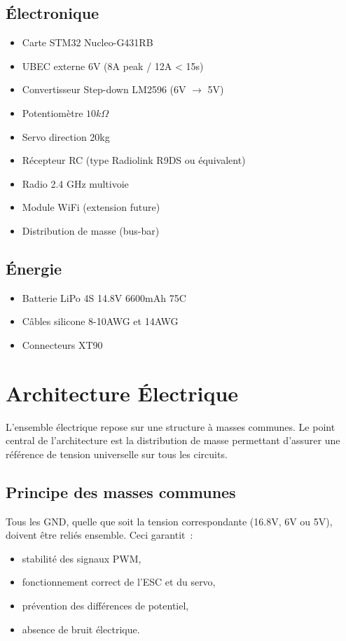 \documentclass[12pt,a4paper,french]{report}
\begin{document}
\section{Électronique}
\begin{itemize}
    \item Carte STM32 Nucleo-G431RB
    \item UBEC externe 6V (8A peak / 12A < 15s)
    \item Convertisseur Step-down LM2596 (6V $\rightarrow$ 5V)
    \item Potentiomètre $10k\Omega$
    \item Servo direction 20kg
    \item Récepteur RC (type Radiolink R9DS ou équivalent)
    \item Radio 2.4 GHz multivoie
    \item Module WiFi (extension future)
    \item Distribution de masse (bus-bar)
\end{itemize}

\section{Énergie}
\begin{itemize}
    \item Batterie LiPo 4S 14.8V 6600mAh 75C
    \item Câbles silicone 8-10AWG et 14AWG
    \item Connecteurs XT90
\end{itemize}


\chapter{Architecture Électrique}

L'ensemble électrique repose sur une structure à masses communes. Le point central de l'architecture est la distribution de masse permettant d'assurer une référence de tension universelle sur tous les circuits.

\section{Principe des masses communes}
Tous les GND, quelle que soit la tension correspondante (16.8V, 6V ou 5V), doivent être reliés ensemble. Ceci garantit~:

\begin{itemize}
    \item stabilité des signaux PWM,
    \item fonctionnement correct de l'ESC et du servo,
    \item prévention des différences de potentiel,
    \item absence de bruit électrique.
\end{itemize}
\end{document}
